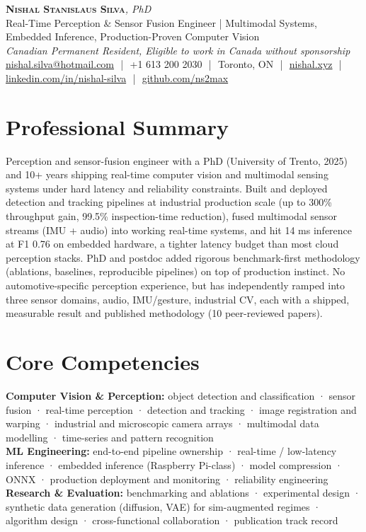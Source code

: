 \documentclass[11pt]{article}
\newcommand{\cvName}{Nishal Stanislaus Silva}
\newcommand{\cvStatus}{Canadian Permanent Resident, Eligible to work in Canada without sponsorship}
\newcommand{\cvTagline}{Real-Time Perception \& Sensor Fusion Engineer | Multimodal Systems, Embedded Inference, Production-Proven Computer Vision}
\begin{document}
\pagestyle{empty}
\begin{center}
    {\LARGE \scshape \textbf{\cvName}}{\large \textit{, PhD}}
    \\[1pt]
    {\small \cvTagline}
    \\[1pt]
    {\footnotesize\textit{\cvStatus}}
    \\[1pt]
    {\small
    \href{mailto:nishal.silva@hotmail.com}{nishal.silva@hotmail.com}
    \,\,|\,\, +1 613 200 2030
    \,\,|\,\, Toronto, ON
    \,\,|\,\, \href{https://nishal.xyz}{nishal.xyz}
    \,\,|\,\, \href{https://www.linkedin.com/in/nishal-silva}{linkedin.com/in/nishal-silva}
    \,\,|\,\, \href{https://github.com/ns2max}{github.com/ns2max}}
\end{center}

\section*{Professional Summary}

Perception and sensor-fusion engineer with a PhD (University of Trento, 2025) and 10+ years shipping real-time computer vision and multimodal sensing systems under hard latency and reliability constraints. Built and deployed detection and tracking pipelines at industrial production scale (up to 300\% throughput gain, 99.5\% inspection-time reduction), fused multimodal sensor streams (IMU + audio) into working real-time systems, and hit 14 ms inference at F1 0.76 on embedded hardware, a tighter latency budget than most cloud perception stacks. PhD and postdoc added rigorous benchmark-first methodology (ablations, baselines, reproducible pipelines) on top of production instinct. No automotive-specific perception experience, but has independently ramped into three sensor domains, audio, IMU/gesture, industrial CV, each with a shipped, measurable result and published methodology (10 peer-reviewed papers).

\section*{Core Competencies}

\textbf{Computer Vision \& Perception:} object detection and classification · sensor fusion · real-time perception · detection and tracking · image registration and warping · industrial and microscopic camera arrays · multimodal data modelling · time-series and pattern recognition\\
\textbf{ML Engineering:} end-to-end pipeline ownership · real-time / low-latency inference · embedded inference (Raspberry Pi-class) · model compression · ONNX · production deployment and monitoring · reliability engineering\\
\textbf{Research \& Evaluation:} benchmarking and ablations · experimental design · synthetic data generation (diffusion, VAE) for sim-augmented regimes · algorithm design · cross-functional collaboration · publication track record
\end{document}
